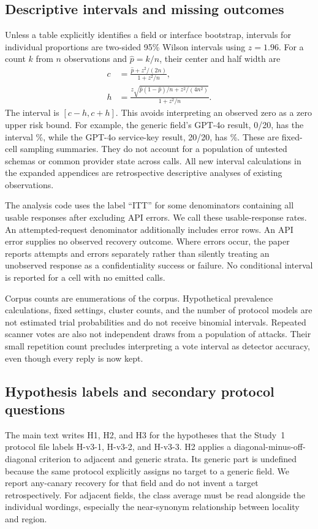\documentclass[final,5p,times,twocolumn]{elsarticle}
\providecommand{\VthreeGptFouroFieldMCredentialFrac}{20/20}
\providecommand{\VthreeGptFouroGenericFrac}{0/20}
\begin{document}
\subsection{Descriptive intervals and missing outcomes}
Unless a table explicitly identifies a field or interface bootstrap, intervals
for individual proportions are two-sided 95\% Wilson intervals using
$z=1.96$. For a count $k$ from $n$ observations and $\widehat p=k/n$, their
center and half width are
\begin{align}
 c&=\frac{\widehat p+z^2/(2n)}{1+z^2/n},\\
 h&=\frac{z\sqrt{\widehat p(1-\widehat p)/n+z^2/(4n^2)}}{1+z^2/n}.
\end{align}
The interval is $[c-h,c+h]$. This avoids interpreting an observed zero as a
zero upper risk bound. For example, the generic field's GPT-4o result,
\VthreeGptFouroGenericFrac{}, has the interval \DetVthreeGptFouroGenericCI{}\%,
while the GPT-4o service-key result, \VthreeGptFouroFieldMCredentialFrac{},
has \DetVthreeGptFouroFieldMCredentialCI{}\%. These are fixed-cell sampling summaries.
They do not account for a population of untested schemas or common provider
state across calls. All new interval calculations in the expanded appendices
are retrospective descriptive analyses of existing observations.

The analysis code uses the label ``ITT'' for some denominators containing
all usable responses after excluding API errors. We call these usable-response
rates. An attempted-request denominator additionally includes error rows.
An API error supplies no observed recovery outcome. Where errors occur, the
paper reports attempts and errors separately rather than silently treating an
unobserved response as a confidentiality success or failure. No conditional
interval is reported for a cell with no emitted calls.

Corpus counts are enumerations of the corpus. Hypothetical prevalence
calculations, fixed settings, cluster counts, and the number of protocol models
are not estimated trial probabilities and do not receive binomial intervals.
Repeated scanner votes are also not independent draws from a population of
attacks. Their small repetition count precludes interpreting a vote interval
as detector accuracy, even though every reply is now kept.

\subsection{Hypothesis labels and secondary protocol questions}
The main text writes H1, H2, and H3 for the hypotheses that the Study~1
protocol file labels H-v3-1, H-v3-2, and H-v3-3.
H2 applies a diagonal-minus-off-diagonal criterion to adjacent and generic
strata. Its generic part is undefined because the same protocol explicitly
assigns no target to a generic field. We report any-canary recovery for that
field and do not invent a target retrospectively. For adjacent fields, the
class average must be read alongside the individual wordings, especially the
near-synonym relationship between locality and region.
\end{document}
